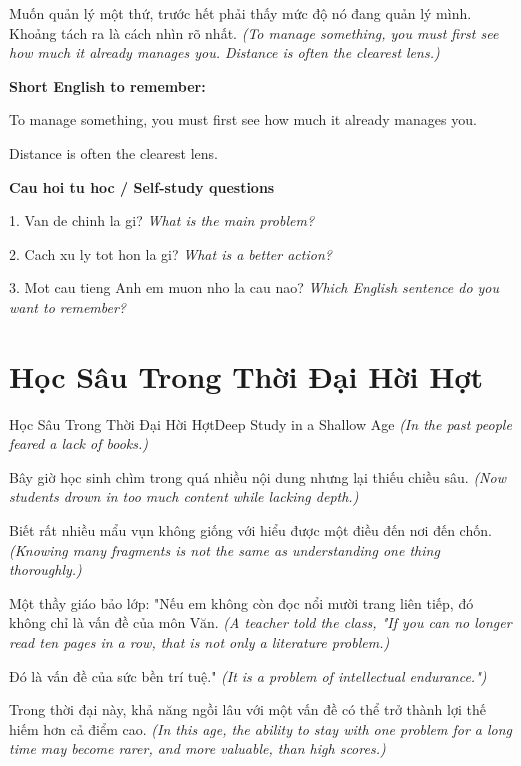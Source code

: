 \begin{baihoc}
Muốn quản lý một thứ, trước hết phải thấy mức độ nó đang quản lý mình. Khoảng tách ra là cách nhìn rõ nhất.
\textit{(To manage something, you must first see how much it already manages you. Distance is often the clearest lens.)}
\end{baihoc}

\begin{ghinhoanh}
\textbf{Short English to remember:}

To manage something, you must first see how much it already manages you.

Distance is often the clearest lens.

\end{ghinhoanh}

\begin{tuhocnhanh}
\textbf{Cau hoi tu hoc / Self-study questions}

1. Van de chinh la gi? \textit{What is the main problem?}

2. Cach xu ly tot hon la gi? \textit{What is a better action?}

3. Mot cau tieng Anh em muon nho la cau nao? \textit{Which English sentence do you want to remember?}
\end{tuhocnhanh}
\ngancach

\section{Học Sâu Trong Thời Đại Hời Hợt}
\begin{truyen}{Học Sâu Trong Thời Đại Hời Hợt}{Deep Study in a Shallow Age}
\textit{(In the past people feared a lack of books.)}

Bây giờ học sinh chìm trong quá nhiều nội dung nhưng lại thiếu chiều sâu.
\textit{(Now students drown in too much content while lacking depth.)}

Biết rất nhiều mẩu vụn không giống với hiểu được một điều đến nơi đến chốn.
\textit{(Knowing many fragments is not the same as understanding one thing thoroughly.)}

Một thầy giáo bảo lớp: "Nếu em không còn đọc nổi mười trang liên tiếp, đó không chỉ là vấn đề của môn Văn.
\textit{(A teacher told the class, "If you can no longer read ten pages in a row, that is not only a literature problem.)}

Đó là vấn đề của sức bền trí tuệ."
\textit{(It is a problem of intellectual endurance.")}

Trong thời đại này, khả năng ngồi lâu với một vấn đề có thể trở thành lợi thế hiếm hơn cả điểm cao.
\textit{(In this age, the ability to stay with one problem for a long time may become rarer, and more valuable, than high scores.)}

\end{truyen}

